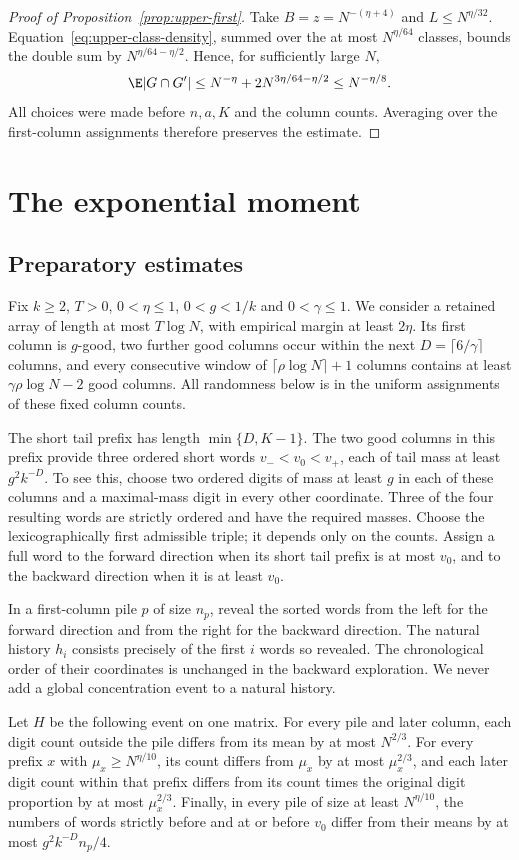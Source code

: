 \begin{proof}[Proof of Proposition~\ref{prop:upper-first}]
Take $B=z=N^{-(\eta+4)}$ and $L\le N^{\eta/32}$.
Equation~\eqref{eq:upper-class-density}, summed over the at most
$N^{\eta/64}$ classes, bounds the double sum by
$N^{\eta/64-\eta/2}$. Hence, for sufficiently large $N$,
\[
 \E|G\cap G'|\le
 N^{-\eta}+2N^{3\eta/64-\eta/2}\le N^{-\eta/8}.
\]
All choices were made before $n,a,K$ and the column counts. Averaging
over the first-column assignments therefore preserves the estimate.
\end{proof}

\section{The exponential moment}\label{sec:upper-exponential}
\subsection{Preparatory estimates}
Fix $k\ge2$, $T>0$, $0<\eta\le1$, $0<g<1/k$ and
$0<\gamma\le1$. We consider a retained array of length at most
$T\log N$, with empirical margin at least $2\eta$. Its first column
is $g$-good, two further good columns occur within the next
$D=\lceil6/\gamma\rceil$ columns, and every consecutive window of
$\lceil\rho\log N\rceil+1$ columns contains at least
$\gamma\rho\log N-2$ good columns. All randomness below is in the
uniform assignments of these fixed column counts.

The short tail prefix has length $\min\{D,K-1\}$. The two good
columns in this prefix provide three
ordered short words $v_-<v_0<v_+$, each of tail mass at least
$g^2k^{-D}$. To see this, choose two ordered digits of mass at least
$g$ in each of these columns and a maximal-mass digit in every other
coordinate. Three of the four resulting words are strictly ordered
and have the required masses. Choose the lexicographically first
admissible triple; it depends only on the counts. Assign a full word
to the forward direction when its short tail prefix is at most $v_0$,
and to the backward direction when it is at least $v_0$.

In a first-column pile $p$ of size $n_p$, reveal the sorted words
from the left for the forward direction and from the right for the
backward direction. The natural history $h_i$ consists precisely of
the first $i$ words so revealed. The chronological order of their
coordinates is unchanged in the backward exploration. We never add
a global concentration event to a natural history.

Let $H$ be the following event on one matrix. For every pile and
later column, each digit count outside the pile differs from its
mean by at most $N^{2/3}$. For every prefix $x$ with
$\mu_x\ge N^{\eta/10}$, its count differs from $\mu_x$ by at most
$\mu_x^{2/3}$, and each later digit count within that prefix differs
from its count times the original digit proportion by at most
$\mu_x^{2/3}$. Finally, in every pile of size at least $N^{\eta/10}$,
the numbers of words strictly before and at or before $v_0$ differ
from their means by at most $g^2k^{-D}n_p/4$.

